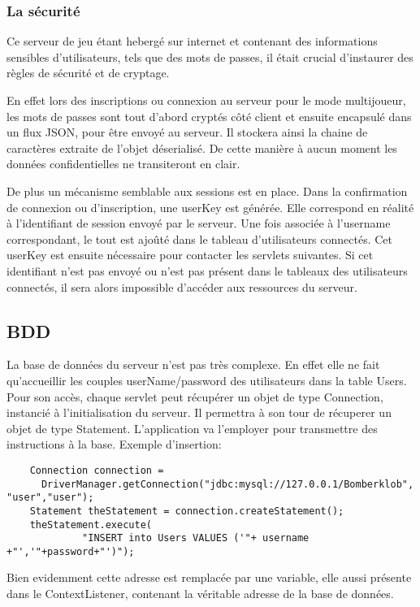 		
	\subsubsection{La sécurité}
	
		Ce serveur de jeu étant hebergé sur internet et contenant des informations
		sensibles d'utilisateurs, tels que des mots de passes, il était crucial
		d'instaurer des règles de sécurité et de cryptage. 
		
		En effet lors des inscriptions ou connexion au serveur pour le mode
		multijoueur, les mots de passes sont tout d'abord cryptés côté client et
		ensuite encapsulé dans un flux JSON, pour être envoyé au serveur. Il stockera
		ainsi la chaine de caractères extraite de l'objet déserialisé. De cette
		manière à aucun moment les données confidentielles ne transiteront en clair.
		
		De plus un mécanisme semblable aux sessions est en place. Dans la
		confirmation de connexion ou d'inscription, une userKey est générée. Elle correspond en
		réalité à l'identifiant de session envoyé par le serveur. Une fois associée
		à l'username correspondant, le tout est ajoûté dans le tableau d'utilisateurs
		connectés.
		Cet userKey est ensuite nécessaire pour contacter les servlets suivantes. Si
		cet identifiant n'est pas envoyé ou n'est pas présent dans le tableaux des
		utilisateurs connectés, il sera alors impossible d'accéder aux ressources du
		serveur.
		
\subsection{BDD}

	La base de données du serveur n'est pas très complexe. En effet elle ne fait
	qu'accueillir les couples userName/password des utilisateurs dans la
	table Users. 
	Pour son accès, chaque servlet peut récupérer un objet de type Connection,
	instancié à l'initialisation du serveur. Il permettra à son tour
	de récuperer un objet de type Statement. L'application va l'employer pour
	transmettre des instructions à la base. Exemple d'insertion: 
		
	\begin{verbatim}
	Connection connection = 
	  DriverManager.getConnection("jdbc:mysql://127.0.0.1/Bomberklob", "user","user");
	Statement theStatement = connection.createStatement();
	theStatement.execute(
		     "INSERT into Users VALUES ('"+ username +"','"+password+"')");
	\end{verbatim}
	
	Bien evidemment cette adresse est remplacée par une variable, elle aussi
	présente dans le ContextListener, contenant la véritable adresse de la base de
	données.
	
	
	
	